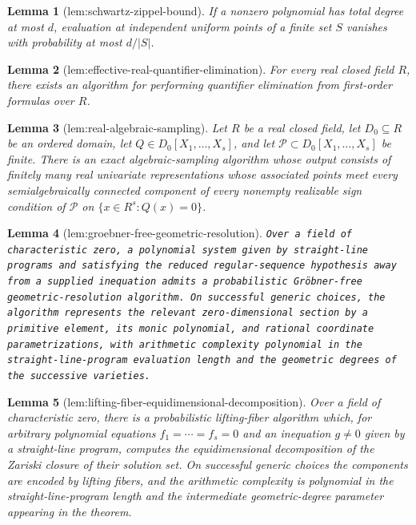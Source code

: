 \documentclass{article}
\newtheorem{lemma}{Lemma}
\begin{document}
\begin{lemma}[lem:schwartz-zippel-bound]\label{lem:schwartz-zippel-bound}
If a nonzero polynomial has total degree at most \(d\), evaluation at independent uniform points of a finite set \(S\) vanishes with probability at most \(d/|S|\).
\end{lemma}

\begin{lemma}[lem:effective-real-quantifier-elimination]\label{lem:effective-real-quantifier-elimination}
For every real closed field \(R\), there exists an algorithm for performing quantifier elimination from first-order formulas over \(R\).
\end{lemma}

\begin{lemma}[lem:real-algebraic-sampling]\label{lem:real-algebraic-sampling}
Let \(R\) be a real closed field, let \(D_0\subseteq R\) be an ordered domain, let \(Q\in D_0[X_1,\ldots,X_s]\), and let \(\mathcal P\subset D_0[X_1,\ldots,X_s]\) be finite. There is an exact algebraic-sampling algorithm whose output consists of finitely many real univariate representations whose associated points meet every semialgebraically connected component of every nonempty realizable sign condition of \(\mathcal P\) on \(\{x\in R^s:Q(x)=0\}\).
\end{lemma}

\begin{lemma}[lem:groebner-free-geometric-resolution]\label{lem:groebner-free-geometric-resolution}
\texttt{Over a field of characteristic zero,\allowbreak{} a polynomial system given by straight-\allowbreak{}line programs and satisfying the reduced regular-\allowbreak{}sequence hypothesis away from a supplied inequation admits a probabilistic Gröbner-\allowbreak{}free geometric-\allowbreak{}resolution algorithm. On successful generic choices,\allowbreak{} the algorithm represents the relevant zero-\allowbreak{}dimensional section by a primitive element,\allowbreak{} its monic polynomial,\allowbreak{} and rational coordinate parametrizations,\allowbreak{} with arithmetic complexity polynomial in the straight-\allowbreak{}line-\allowbreak{}program evaluation length and the geometric degrees of the successive varieties.}
\end{lemma}

\begin{lemma}[lem:lifting-fiber-equidimensional-decomposition]\label{lem:lifting-fiber-equidimensional-decomposition}
Over a field of characteristic zero, there is a probabilistic lifting-fiber algorithm which, for arbitrary polynomial equations \(f_1=\cdots=f_s=0\) and an inequation \(g\neq0\) given by a straight-line program, computes the equidimensional decomposition of the Zariski closure of their solution set. On successful generic choices the components are encoded by lifting fibers, and the arithmetic complexity is polynomial in the straight-line-program length and the intermediate geometric-degree parameter appearing in the theorem.
\end{lemma}
\end{document}
